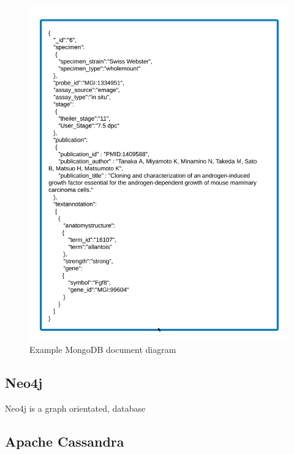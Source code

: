 \newpage
\begin{figure}[H]\begin{center}\includegraphics[width=1\linewidth]{images/mongo_modeldesign}\caption{Example MongoDB document diagram}\label{fig:mongo}\end{center}\end{figure}

\newpage
\subsection*{Neo4j}
Neo4j is a graph orientated,  database

\subsection*{Apache Cassandra}